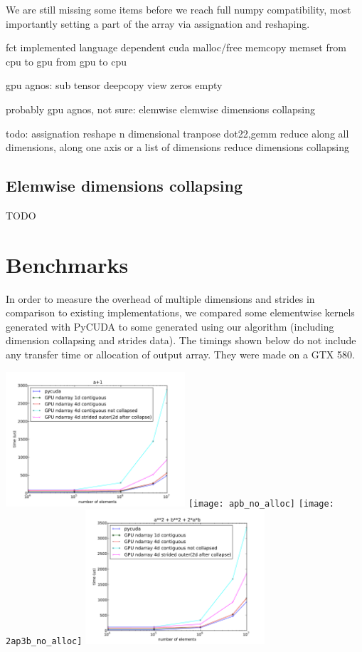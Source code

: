 \documentclass{article} %
\begin{document}
We are still missing some items before we reach full numpy compatibility, most importantly setting a part of the array via assignation and reshaping.

fct implemented language dependent
cuda
malloc/free
memcopy
memset
from cpu to gpu
from gpu to cpu

gpu agnos:
sub tensor
deepcopy
view
zeros
empty

probably gpu agnos, not sure:
elemwise
elemwise dimensions collapsing


todo:
assignation
reshape
n dimensional tranpose
dot22,gemm
reduce along all dimensions, along one axis or a list of dimensions
reduce dimensions collapsing

\subsection{Elemwise dimensions collapsing}
TODO

\section{Benchmarks}

In order to measure the overhead of multiple dimensions and strides in comparison to existing implementations, we compared some elementwise kernels generated with PyCUDA to some generated using our algorithm (including dimension collapsing and strides data).  The timings shown below do not include any transfer time or allocation of output array.  They were made on a GTX 580.

\includegraphics[width=0.5\textwidth]{ap1_no_alloc}
\texttt{[image: apb\_no\_alloc]}
\texttt{[image: 2ap3b\_no\_alloc]}
\includegraphics[width=0.5\textwidth]{a2pb2p2ab_no_alloc}
\end{document}
